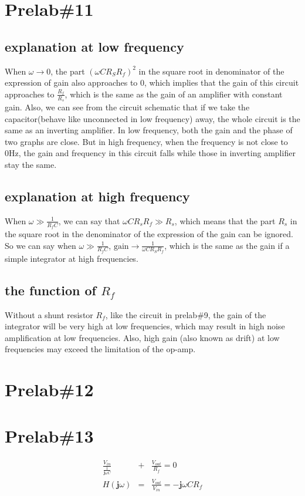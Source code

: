 \documentclass{IEEEtran}
\begin{document}
	\section{\textbf{Prelab\#11}}
	\subsection{explanation at low frequency}
	When $ \omega \to 0 $, the part $ (\omega C R_S R_f)^2 $ in the square root in denominator of the expression of gain also approaches to 0, which implies that the gain of this circuit approaches to $ \frac{R_f}{R_s} $, which is the same as the gain of an amplifier with constant gain. Also, we can see from the circuit schematic that if we take the capacitor(behave like unconnected in low frequency) away, the whole circuit is the same as an inverting amplifier. In low frequency, both the gain and the phase of two graphs are close. But in high frequency, when the frequency is not close to $ 0\si{\hertz} $, the gain and frequency in this circuit falls while those in inverting amplifier stay the same. 
	\subsection{explanation at high frequency}
	When $ \omega \gg \frac{1}{R_fC} $, we can say that $ \omega CR_sR_f \gg R_s $, which means that the part $ R_s $ in the square root in the denominator of the expression of the gain can be ignored. So we can say when $ \omega \gg \frac{1}{R_fC} $, $ \mathrm{gain} \to \frac{1}{\omega CR_SR_f} $, which is the same as the gain if a simple integrator at high frequencies.
	\subsection{the function of $ R_f $}
	Without a shunt resistor $ R_f $, like the circuit in prelab\#9, the gain of the integrator will be very high at low frequencies, which may result in high noise amplification at low frequencies. Also, high gain (also known as drift) at low frequencies may exceed the limitation of the op-amp.
	\section{\textbf{Prelab\#12}}
	\section{\textbf{Prelab\#13}}
	\begin{eqnarray*}
		\frac{V_{in}}{\frac{1}{\mathbf{j}\omega C}} & + & \frac{V_{out}}{R_f}  =  0\\
		H(\mathbf{j}\omega) & = & \frac{V_{out}}{V_{in}}  =  -\mathbf{j}\omega CR_f
	\end{eqnarray*}
\end{document}
